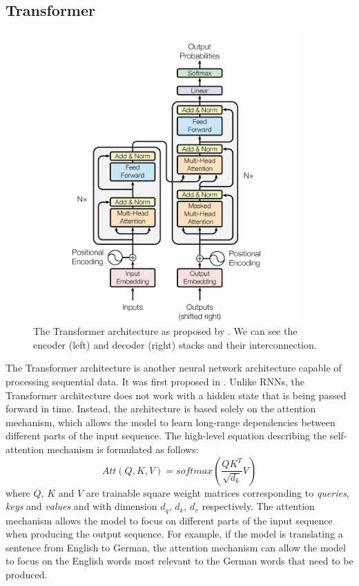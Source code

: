 \subsection{Transformer}
\label{background:trafo}
\begin{figure}[ht]
    \centering
    \includegraphics[width=0.9\textwidth]{images/transfo-arch.png}
    \caption{The Transformer architecture as proposed by \citep{vaswani2017attention}. We can see the encoder (left) and decoder (right) stacks and their interconnection.}
    \label{fig:trafo}
\end{figure}
The Transformer architecture is another neural network architecture capable of processing sequential data.
It was first proposed in \citet{vaswani2017attention}.
Unlike RNNs, the Transformer architecture does not work with a hidden state that is being passed forward in time.
Instead, the architecture is based solely on the attention mechanism, which allows the model to learn long-range dependencies between different parts of the input sequence.
The high-level equation describing the self-attention mechanism is formulated as follows:
\begin{equation*}
    Att(Q,K,V) = softmax(\frac{QK^T}{\sqrt{d_k}}V)
\end{equation*}
where $Q$, $K$ and $V$ are trainable square weight matrices corresponding to \emph{queries}, \emph{keys} and \emph{values} and with dimension $d_q$, $d_k$, $d_v$ respectively.
The attention mechanism allows the model to focus on different parts of the input sequence when producing the output sequence.
For example, if the model is translating a sentence from English to German, the attention mechanism can allow the model to focus on the English words most relevant to the German words that need to be produced.

